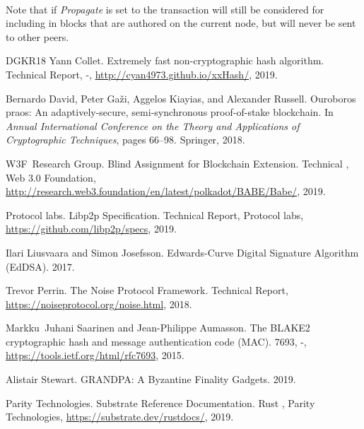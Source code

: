\documentclass{book}
\newcommand{\tmem}[1]{{\em #1\/}}
\newcommand{\tmtextit}[1]{{\itshape{#1}}}
\newcommand{\tmverbatim}[1]{{\ttfamily{#1}}}
\begin{document}
\

Note that if {\tmem{Propagate}} is set to \tmverbatim{false} the transaction
will still be considered for including in blocks that are authored on the
current node, but will never be sent to other peers.

\begin{thebibliography}{DGKR18}
  Yann Collet. {\newblock}Extremely fast
  non-cryptographic hash algorithm. {\newblock}Technical Report, -,
  \url{http://cyan4973.github.io/xxHash/}, 2019.{\newblock}
  
  Bernardo David, Peter Ga{\v z}i,
  Aggelos Kiayias, and  Alexander Russell. {\newblock}Ouroboros praos: An
  adaptively-secure, semi-synchronous proof-of-stake blockchain. {\newblock}In
  \tmtextit{Annual International Conference on the Theory and Applications of
  Cryptographic Techniques},  pages  66--98. Springer, 2018.{\newblock}
  
  W3F~Research Group.
  {\newblock}Blind Assignment for Blockchain Extension. {\newblock}Technical
  {}, Web 3.0 Foundation,
  \url{http://research.web3.foundation/en/latest/polkadot/BABE/Babe/},
  2019.{\newblock}
  
  Protocol labs. {\newblock}Libp2p
  Specification. {\newblock}Technical Report, Protocol labs,
  \url{https://github.com/libp2p/specs}, 2019.{\newblock}
  
  Ilari Liusvaara  and  Simon
  Josefsson. {\newblock}Edwards-Curve Digital Signature Algorithm (EdDSA).
  {\newblock}2017.{\newblock}
  
  Trevor Perrin. {\newblock}The Noise
  Protocol Framework. {\newblock}Technical Report,
  \url{https://noiseprotocol.org/noise.html}, 2018.{\newblock}
  
  Markku~Juhani Saarinen  and 
  Jean-Philippe Aumasson. {\newblock}The BLAKE2 cryptographic hash and message
  authentication code (MAC). {\newblock}{} 7693, -,
  \url{https://tools.ietf.org/html/rfc7693}, 2015.{\newblock}
  
  Alistair Stewart. {\newblock}GRANDPA:
  A Byzantine Finality Gadgets. {\newblock}2019.{\newblock}
  
  Parity Technologies.
  {\newblock}Substrate Reference Documentation. {\newblock}Rust
  {}, Parity Technologies,
  \url{https://substrate.dev/rustdocs/}, 2019.{\newblock}
\end{thebibliography}

\printindex
\end{document}
